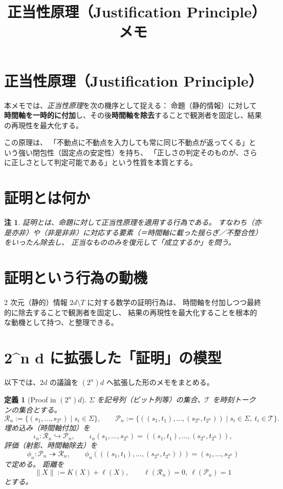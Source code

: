 \documentclass[12pt,a4paper]{article}
\newcommand{\Rep}{\mathcal{R}}
\newcommand{\Prf}{\mathcal{P}}
\newcommand{\Tset}{\mathcal{T}}
\newtheorem{definition}{定義}[section]
\newtheorem{remark}{注}[section]
\begin{document}
\title{正当性原理（Justification Principle）メモ}
\author{}
\date{}
\maketitle

\section{正当性原理（Justification Principle）}
本メモでは、\emph{正当性原理}を次の機序として捉える：
命題（静的情報）に対して\textbf{時間軸を一時的に付加}し、その後\textbf{時間軸を除去}することで観測者を固定し、結果の再現性を最大化する。

この原理は、
「不動点に不動点を入力しても常に同じ不動点が返ってくる」という強い閉包性（固定点の安定性）を持ち、
「正しさの判定そのものが、さらに正しさとして判定可能である」という性質を本質とする。

\section{証明とは何か}
\begin{remark}
証明とは、命題に対して正当性原理を適用する行為である。
すなわち（亦是亦非）や（非是非非）に対応する要素（＝時間軸に載った揺らぎ／不整合性）をいったん除去し、
正当なもののみを復元して「成立するか」を問う。
\end{remark}

\section{証明という行為の動機}
2 次元（静的）情報 $2d\setminus T$ に対する数学の証明行為は、
時間軸を付加しつつ最終的に除去することで観測者を固定し、
結果の再現性を最大化することを根本的な動機として持つ、と整理できる。

\section{2^n d に拡張した「証明」の模型}
以下では、$2d$ の議論を $(2^n)d$ へ拡張した形のメモをまとめる。

\begin{definition}[Proof in $(2^{n})d$]
$\Sigma$ を記号列（ビット列等）の集合、$\Tset$ を時刻トークンの集合とする。
\[
  \Rep_{n} := \{(s_{1},\dots ,s_{2^{n}})\mid s_{i}\in\Sigma\},
  \qquad
  \Prf_{n} := \{((s_{1},t_{1}),\dots ,(s_{2^{n}},t_{2^{n}}))\mid s_i\in\Sigma,\ t_{i}\in\Tset\}.
\]
埋め込み（時間軸付加）を
\[
  \iota_{n}\colon\Rep_{n}\hookrightarrow\Prf_{n},
  \qquad
  \iota_{n}(s_{1},\dots ,s_{2^{n}})
    = ((s_{1},t_{1}),\dots ,(s_{2^{n}},t_{2^{n}})),
\]
評価（射影、時間軸除去）を
\[
  \phi_{n}\colon\Prf_{n}\twoheadrightarrow\Rep_{n},
  \qquad
  \phi_{n}(((s_{1},t_{1}),\dots ,(s_{2^{n}},t_{2^{n}})))
    = (s_{1},\dots ,s_{2^{n}})
\]
で定める。
距離を
\[
  \|X\|:=K(X)+\ell(X),\qquad
  \ell(\Rep_{n})=0,\ \ell(\Prf_{n})=1
\]
とする。
\end{definition}
\end{document}
